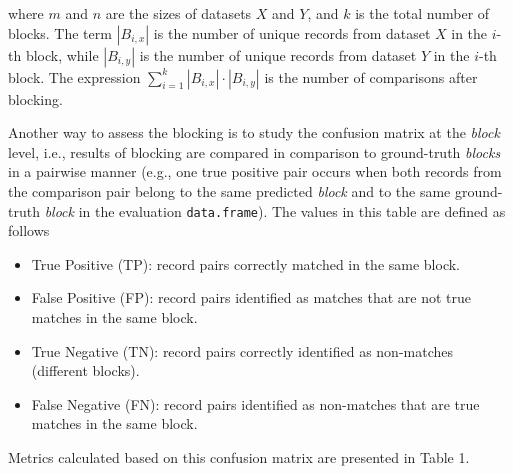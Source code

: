\noindent where \(m\) and \(n\) are the sizes of datasets \(X\) and \(Y\), and
\(k\) is the total number of blocks. The term \(|B_{i,x}|\) is the number of
unique records from dataset \(X\) in the \(i\)-th block, while \(|B_{i,y}|\)
is the number of unique records from dataset \(Y\) in the \(i\)-th block.
The expression \(\sum\limits_{i=1}^{k} |B_{i,x}| \cdot |B_{i,y}|\) is the
number of comparisons after blocking.

Another way to assess the blocking is to study the confusion matrix at
the \emph{block} level, i.e., results of blocking are compared in comparison
to ground-truth \emph{blocks} in a pairwise manner (e.g., one true positive
pair occurs when both records from the comparison pair belong to the
same predicted \emph{block} and to the same ground-truth \emph{block} in the
evaluation \texttt{data.frame}). The values in this table are defined as
follows

\begin{itemize}
\tightlist
\item
  True Positive (TP): record pairs correctly matched in the same
  block.
\item
  False Positive (FP): record pairs identified as matches that are
  not true matches in the same block.
\item
  True Negative (TN): record pairs correctly identified as non-matches
  (different blocks).
\item
  False Negative (FN): record pairs identified as non-matches that are true
  matches in the same block.
\end{itemize}

Metrics calculated based on this confusion matrix are presented in Table 1.

